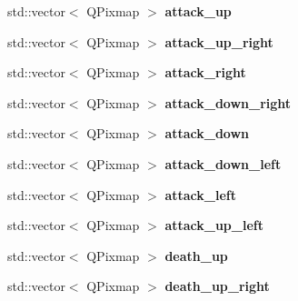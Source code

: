 \begin{DoxyCompactItemize}
\item 
\hypertarget{class_default_unit_a83cbc7ac07db0b091346b032267814ff}{}std\+::vector$<$ Q\+Pixmap $>$ {\bfseries attack\+\_\+up}\label{class_default_unit_a83cbc7ac07db0b091346b032267814ff}

\item 
\hypertarget{class_default_unit_a12031034b338f77819dd9b0b67fa1bee}{}std\+::vector$<$ Q\+Pixmap $>$ {\bfseries attack\+\_\+up\+\_\+right}\label{class_default_unit_a12031034b338f77819dd9b0b67fa1bee}

\item 
\hypertarget{class_default_unit_a77f3cc1016678235f4fcee80947b52ec}{}std\+::vector$<$ Q\+Pixmap $>$ {\bfseries attack\+\_\+right}\label{class_default_unit_a77f3cc1016678235f4fcee80947b52ec}

\item 
\hypertarget{class_default_unit_aa57b957504dc15180dd844384bcd014a}{}std\+::vector$<$ Q\+Pixmap $>$ {\bfseries attack\+\_\+down\+\_\+right}\label{class_default_unit_aa57b957504dc15180dd844384bcd014a}

\item 
\hypertarget{class_default_unit_a678c7fd0d69c4c6c303e2dfcc7fc2b93}{}std\+::vector$<$ Q\+Pixmap $>$ {\bfseries attack\+\_\+down}\label{class_default_unit_a678c7fd0d69c4c6c303e2dfcc7fc2b93}

\item 
\hypertarget{class_default_unit_af657959840f763dad1125bb7ff883c56}{}std\+::vector$<$ Q\+Pixmap $>$ {\bfseries attack\+\_\+down\+\_\+left}\label{class_default_unit_af657959840f763dad1125bb7ff883c56}

\item 
\hypertarget{class_default_unit_a48d1cd6fa16f1740c92e028879b6d947}{}std\+::vector$<$ Q\+Pixmap $>$ {\bfseries attack\+\_\+left}\label{class_default_unit_a48d1cd6fa16f1740c92e028879b6d947}

\item 
\hypertarget{class_default_unit_a1e00152adb605369715c422fbdc37ae6}{}std\+::vector$<$ Q\+Pixmap $>$ {\bfseries attack\+\_\+up\+\_\+left}\label{class_default_unit_a1e00152adb605369715c422fbdc37ae6}

\item 
\hypertarget{class_default_unit_a9b7fe9f5001854907b5984507e606f97}{}std\+::vector$<$ Q\+Pixmap $>$ {\bfseries death\+\_\+up}\label{class_default_unit_a9b7fe9f5001854907b5984507e606f97}

\item 
\hypertarget{class_default_unit_ad901be7a6dc8ca406db2f52f510fde59}{}std\+::vector$<$ Q\+Pixmap $>$ {\bfseries death\+\_\+up\+\_\+right}\label{class_default_unit_ad901be7a6dc8ca406db2f52f510fde59}


\end{DoxyCompactItemize}
